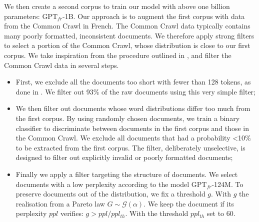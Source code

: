 We then create a second corpus to train our model with above one billion parameters: $\text{GPT}_{fr}$-1B. Our approach is to augment the first corpus with data from the Common Crawl in French. The Common Crawl data typically contains many poorly formatted, inconsistent documents. We therefore apply strong filters to select a portion of the Common Crawl, whose distribution is close to our first corpus. We take inspiration from the procedure outlined in \textcite{brown_20}, and filter the Common Crawl data in several steps.
\begin{itemize}
    \item First, we exclude all the documents too short with fewer than 128 tokens, as done in \textcite{shoeybi_19}. We filter out 93\% of the raw documents using this very simple filter; 
    \item We then filter out documents whose word distributions differ too much from the first corpus. By using  randomly chosen documents, we train a binary classifier to discriminate between documents in the first corpus and those in the Common Crawl. We exclude all documents that had a probability <10\% to be extracted from the first corpus. The filter, deliberately unselective, is designed to filter out explicitly invalid or poorly formatted documents;
    \item Finally we apply a filter targeting the structure of documents. We select documents with a low perplexity according to the model $\text{GPT}_{fr}$-124M. To preserve documents out of the distribution, we fix a threshold $g$. With $g$ the realisation from a Pareto law $G \sim \mathcal{G}(\alpha)$. We keep the document if its perplexity $ppl$ verifies: $g > ppl / ppl_{th}$. With the threshold $ppl_{th}$ set to $60$. 
\end{itemize}

